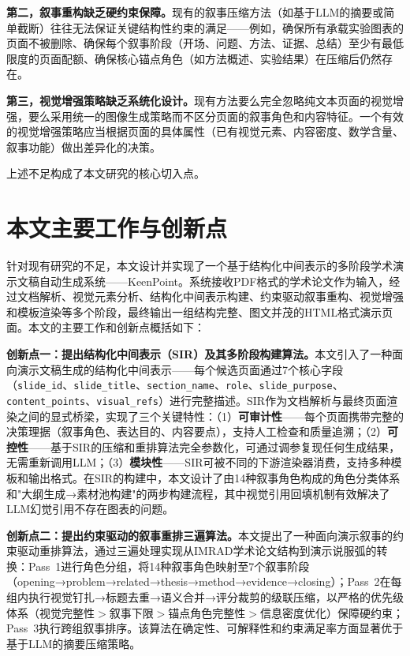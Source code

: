 \textbf{第二，叙事重构缺乏硬约束保障。}现有的叙事压缩方法（如基于LLM的摘要或简单截断）往往无法保证关键结构性约束的满足——例如，确保所有承载实验图表的页面不被删除、确保每个叙事阶段（开场、问题、方法、证据、总结）至少有最低限度的页面配额、确保核心锚点角色（如方法概述、实验结果）在压缩后仍然存在。

\textbf{第三，视觉增强策略缺乏系统化设计。}现有方法要么完全忽略纯文本页面的视觉增强，要么采用统一的图像生成策略而不区分页面的叙事角色和内容特征。一个有效的视觉增强策略应当根据页面的具体属性（已有视觉元素、内容密度、数学含量、叙事功能）做出差异化的决策。

上述不足构成了本文研究的核心切入点。

\section{本文主要工作与创新点}

针对现有研究的不足，本文设计并实现了一个基于结构化中间表示的多阶段学术演示文稿自动生成系统——KeenPoint。系统接收PDF格式的学术论文作为输入，经过文档解析、视觉元素分析、结构化中间表示构建、约束驱动叙事重构、视觉增强和模板渲染等多个阶段，最终输出一组结构完整、图文并茂的HTML格式演示页面。本文的主要工作和创新点概括如下：

\textbf{创新点一：提出结构化中间表示（SIR）及其多阶段构建算法。}本文引入了一种面向演示文稿生成的结构化中间表示——每个候选页面通过7个核心字段（\texttt{slide\_id}、\texttt{slide\_title}、\texttt{section\_name}、\texttt{role}、\texttt{slide\_purpose}、\texttt{content\_points}、\texttt{visual\_refs}）进行完整描述。SIR作为文档解析与最终页面渲染之间的显式桥梁，实现了三个关键特性：（1）\textbf{可审计性}——每个页面携带完整的决策理据（叙事角色、表达目的、内容要点），支持人工检查和质量追溯；（2）\textbf{可控性}——基于SIR的压缩和重排算法完全参数化，可通过调参复现任何生成结果，无需重新调用LLM；（3）\textbf{模块性}——SIR可被不同的下游渲染器消费，支持多种模板和输出格式。在SIR的构建中，本文设计了由14种叙事角色构成的角色分类体系和"大纲生成→素材池构建"的两步构建流程，其中视觉引用回填机制有效解决了LLM幻觉引用不存在图表的问题。

\textbf{创新点二：提出约束驱动的叙事重排三遍算法。}本文提出了一种面向演示叙事的约束驱动重排算法，通过三遍处理实现从IMRAD学术论文结构到演示说服弧的转换：Pass~1进行角色分组，将14种叙事角色映射至7个叙事阶段（opening→problem→related→thesis→method→evidence→closing）；Pass~2在每组内执行视觉钉扎→标题去重→语义合并→评分裁剪的级联压缩，以严格的优先级体系（视觉完整性$>$叙事下限$>$锚点角色完整性$>$信息密度优化）保障硬约束；Pass~3执行跨组叙事排序。该算法在确定性、可解释性和约束满足率方面显著优于基于LLM的摘要压缩策略。

